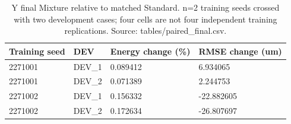 \begin{table}[t]
\centering\small
\caption{Y final Mixture relative to matched Standard. n=2 training seeds crossed with two development cases; four cells are not four independent training replications. Source: tables/paired\_final.csv.}
\label{tab:mixture}
\begin{tabular}{llll}
\hline
Training seed & DEV & Energy change (\%) & RMSE change (um) \\
\hline
2271001 & DEV\_1 & 0.089412 & 6.934065 \\
2271001 & DEV\_2 & 0.071389 & 2.244753 \\
2271002 & DEV\_1 & 0.156332 & -22.882605 \\
2271002 & DEV\_2 & 0.172634 & -26.807697 \\
\hline
\end{tabular}
\end{table}
